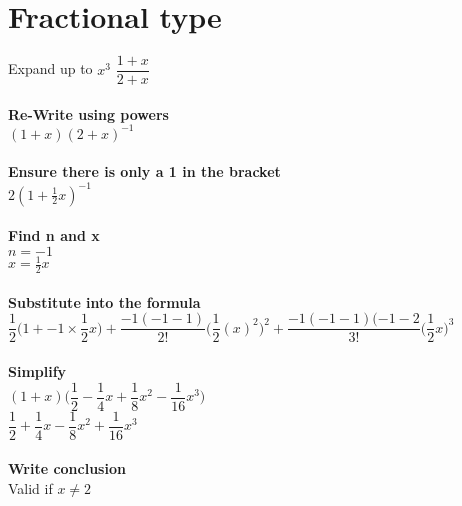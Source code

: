 \documentclass{article}[18pt]
\begin{document}
\section{Fractional type}
Expand up to $x^3$ $\dfrac{1+x}{2+x}$\\
\\
\textbf{Re-Write using powers}\\
$(1+x)(2+x)^{-1}$\\
\\
\textbf{Ensure there is only a 1 in the bracket}\\
$2(1+\frac{1}{2}x)^{-1}$\\
\\
\textbf{Find n and x}\\
$n=-1$\\
$x=\frac{1}{2}x$\\
\\
\textbf{Substitute into the formula}\\
$\dfrac{1}{2}\Bigg(1+-1\times\dfrac{1}{2}x\Bigg)+\dfrac{-1(-1-1)}{2!}\Bigg(\dfrac{1}{2}(x)^2\Bigg)^2+\dfrac{-1(-1-1)(-1-2}{3!}\Bigg(\dfrac{1}{2}x\Bigg)^3$\\
\\
\textbf{Simplify}\\
$(1+x)\Bigg(\dfrac{1}{2}-\dfrac{1}{4}x+\dfrac{1}{8}x^2-\dfrac{1}{16}x^3\Bigg)$\\
$\dfrac{1}{2}+\dfrac{1}{4}x-\dfrac{1}{8}x^2+\dfrac{1}{16}x^3$\\
\\
\textbf{Write conclusion}\\
Valid if $x\neq2$\\
\newpage
\end{document}

